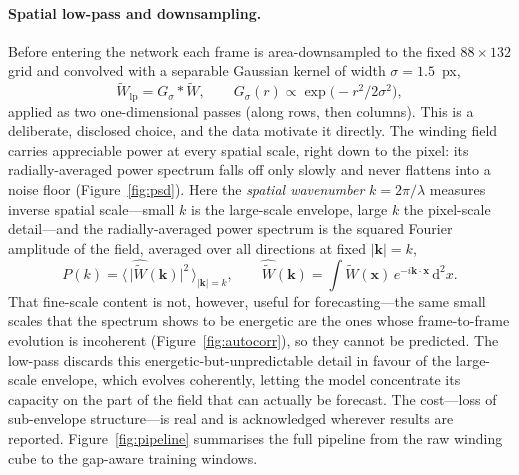 \paragraph{Spatial low-pass and downsampling.}
Before entering the network each frame is area-downsampled to the fixed
$88\times132$ grid and convolved with a separable Gaussian kernel of width
$\sigma=1.5$~px,
\begin{equation}
  \tilde{W}_{\text{lp}} = G_\sigma * \tilde{W},
  \qquad G_\sigma(r)\propto \exp\!\big(-r^2/2\sigma^2\big),
  \label{eq:lowpass}
\end{equation}
applied as two one-dimensional passes (along rows, then columns). This is a
deliberate, disclosed choice, and the data motivate it directly. The winding
field carries appreciable power at every spatial scale, right down to the pixel:
its radially-averaged power spectrum falls off only slowly and never flattens into
a noise floor (Figure~\ref{fig:psd}). Here the \emph{spatial wavenumber}
$k=2\pi/\lambda$ measures inverse spatial scale---small $k$ is the large-scale
envelope, large $k$ the pixel-scale detail---and the radially-averaged power
spectrum is the squared Fourier amplitude of the field, averaged over all
directions at fixed $|\mathbf{k}|=k$,
\begin{equation}
  P(k) = \big\langle\, \lvert\hat{\tilde{W}}(\mathbf{k})\rvert^2 \,\big\rangle_{\lvert\mathbf{k}\rvert=k},
  \qquad
  \hat{\tilde{W}}(\mathbf{k}) = \int \tilde{W}(\mathbf{x})\,e^{-i\mathbf{k}\cdot\mathbf{x}}\,\mathrm{d}^2x .
  \label{eq:psd}
\end{equation} That fine-scale content is not, however, useful for
forecasting---the same small scales that the spectrum shows to be energetic are
the ones whose frame-to-frame evolution is incoherent
(Figure~\ref{fig:autocorr}), so they cannot be predicted. The low-pass discards
this energetic-but-unpredictable detail in favour of the large-scale envelope,
which evolves coherently, letting the model concentrate its capacity on the part
of the field that can actually be forecast. The cost---loss of sub-envelope
structure---is real and is acknowledged wherever results are reported.
Figure~\ref{fig:pipeline} summarises the full pipeline from the raw winding cube
to the gap-aware training windows.






